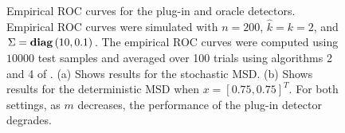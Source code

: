 \begin{figure}[t]
\centering
{}
\vspace{-0.1in}
\caption{Empirical ROC curves for the plug-in and oracle detectors. Empirical ROC curves were simulated with $n=200$, $\widehat{k}=k=2$, and $\Sigma =\mathop{\bf diag}\left(10,0.1\right)$. The empirical ROC curves were computed using $10000$ test samples and averaged over 100 trials using algorithms 2 and 4 of \cite{fawcett2006introduction}. (a) Shows results for the stochastic MSD. (b) Shows results for the deterministic MSD when $x=[0.75,0.75]^T$. For both settings, as $m$ decreases, the performance of the plug-in detector degrades.}
\label{fig:plugin_v_oracle}
\vspace{-0.3in}
\end{figure}

